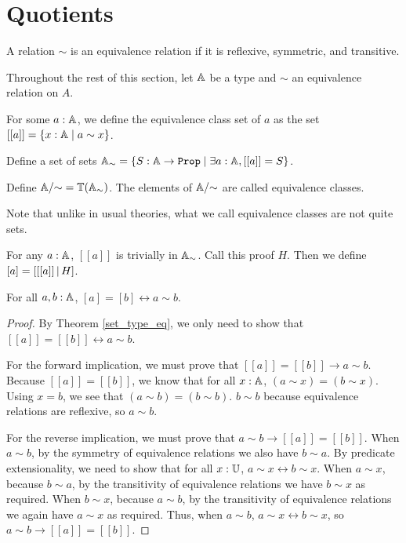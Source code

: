 \documentclass[../math.tex]{subfiles}
\begin{document}
\section{Quotients}

\begin{definition}
    A relation $\sim$ is an equivalence relation if it is reflexive, symmetric,
    and transitive.
\end{definition}

Throughout the rest of this section, let $\mathbb{A}$ be a type and $\sim$ an
equivalence relation on $A$.

\begin{definition}
    For some $a : \mathbb{A}$, we define the equivalence class set of $a$ as the set
    $[[a]] = \{x : \mathbb{A} \mid a \sim x\}$.
\end{definition}

\begin{definition}
    Define a set of sets $\A_\sim = \{S : \A \to \Prop \mid \exists a : \A,
    [[a]] = S\}$.
\end{definition}

\begin{definition}
    Define $\mathbb{A}/{\sim} = \mathbb{T}(\mathbb{A}_\sim)$.  The elements of $\mathbb{A}/{\sim}$ are called
    equivalence classes.
\end{definition}
Note that unlike in usual theories, what we call equivalence classes are not
quite sets.

\begin{definition}
    For any $a : \mathbb{A}$, $[ [a]]$ is trivially in $\mathbb{A}_\sim$.  Call this proof $H$.
    Then we define $[a] = [ [ [a]] \, | \, H ]$.
\end{definition}

\begin{theorem} \label{equiv_eq}
    For all $a, b : \mathbb{A}$, $[a] = [b] \leftrightarrow a \sim b$.
\end{theorem}
\begin{proof}
    By Theorem \ref{set_type_eq}, we only need to show that $[ [a]] = [ [b]]
    \leftrightarrow a \sim b$.

    For the forward implication, we must prove that $[ [a]] = [ [b]] \to a \sim
    b$.  Because $[ [a]] = [ [b]]$, we know that for all $x : \mathbb{A}$, $(a \sim x) =
    (b \sim x)$.  Using $x = b$, we see that $(a \sim b) = (b \sim b)$.  $b \sim
    b$ because equivalence relations are reflexive, so $a \sim b$.

    For the reverse implication, we must prove that $a \sim b \to [ [a]] = [
    [b]]$.  When $a \sim b$, by the symmetry of equivalence relations we also
    have $b \sim a$.  By predicate extensionality, we need to show that for all
    $x : \mathbb{U}$, $a \sim x \leftrightarrow b \sim x$.  When $a \sim x$, because $b
    \sim a$, by the transitivity of equivalence relations we have $b \sim x$ as
    required.  When $b \sim x$, because $a \sim b$, by the transitivity of
    equivalence relations we again have $a \sim x$ as required.  Thus, when $a
    \sim b$, $a \sim x \leftrightarrow b \sim x$, so $a \sim b \to [ [a]] = [
    [b]]$.
\end{proof}
\end{document}
